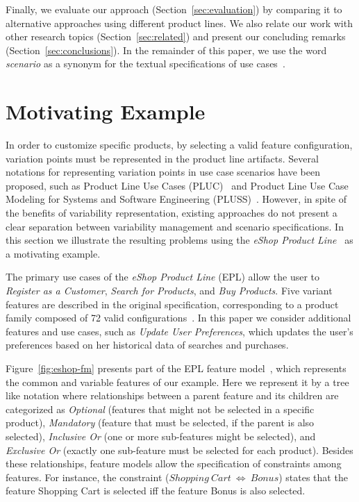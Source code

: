 \documentclass{sig-alternate}
\begin{document}
Finally, we evaluate our approach (Section~\ref{sec:evaluation}) by comparing it
to alternative approaches using different product lines. We also relate our work
with other research topics (Section~\ref{sec:related}) and present our concluding
remarks (Section~\ref{sec:conclusions}). In the remainder of this paper, we use the word
\emph{scenario} as a synonym for the textual specifications of use
cases~\cite{Cockburn:2000aa}.
\section{Motivating Example}
\label{sec:problem}

In order to customize specific products, by selecting a valid feature
configuration, variation points must be represented in the product line
artifacts. Several notations for representing variation points in use case
scenarios have been proposed, such as Product Line Use Cases
(PLUC)~\cite{Bertolino:2003aa} and Product Line Use Case Modeling for Systems
and Software Engineering (PLUSS)~\cite{Eriksson:2005aa}. However, in spite of
the benefits of variability representation, existing approaches do not present
a clear separation between variability management and scenario specifications. In this
section we illustrate the resulting problems using the \emph{eShop Product
Line}~\cite{Pohl:eshop} as a motivating example.

The primary use cases of the \emph{eShop Product Line} (EPL) allow the user to
\emph{Register as a Customer}, \emph{Search for Products}, and \emph{Buy
Products}.  Five variant features are described in the original specification,
corresponding to a product family composed of 72 valid
configurations~\cite{Pohl:eshop}. In this paper we consider additional features
and use cases, such as \emph{Update User Preferences}, which updates the user's
preferences based on her historical data of searches and purchases.

Figure~\ref{fig:eshop-fm} presents part of the
EPL feature model~\cite{Gheyi:2006aa,Czarnecki:2000aa}, which represents the
common and variable features of our example. Here we represent it by a tree like
notation where relationships between a parent feature and its children are
categorized as \emph{Optional} (features that might not be selected in a specific product), \emph{Mandatory} (feature that must be selected, if the parent
is also selected), \emph{Inclusive Or} (one or more sub-features might be selected), and
\emph{Exclusive Or} (exactly one sub-feature must be selected for each product).
Besides these relationships, feature models allow the specification of
constraints among features. For instance, the constraint ($Shopping\ Cart\
\Leftrightarrow\ Bonus$) states that the feature Shopping Cart is selected iff
the feature Bonus is also selected.
\end{document}

